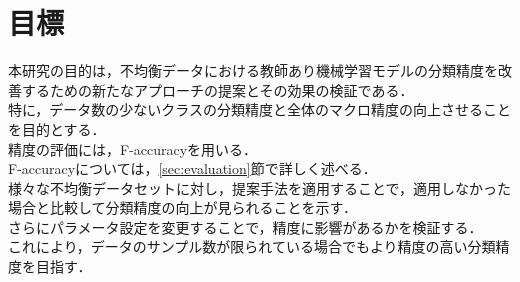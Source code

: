 \section{目標}

本研究の目的は，不均衡データにおける教師あり機械学習モデルの分類精度を改善するための新たなアプローチの提案とその効果の検証である．\\
特に，データ数の少ないクラスの分類精度と全体のマクロ精度の向上させることを目的とする．\\
精度の評価には，F-accuracyを用いる．\\
F-accuracyについては，\ref{sec:evaluation}節で詳しく述べる．\\
様々な不均衡データセットに対し，提案手法を適用することで，適用しなかった場合と比較して分類精度の向上が見られることを示す．\\
さらにパラメータ設定を変更することで，精度に影響があるかを検証する．\\
これにより，データのサンプル数が限られている場合でもより精度の高い分類精度を目指す．\\
